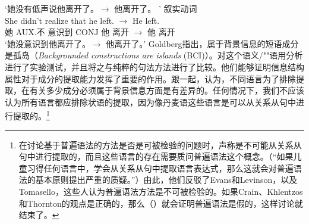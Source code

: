 \glt `她没有低声说他离开了。$\to$ 他离开了。 '
\ex 叙实动词\\
\gll She didn't realize that he left. $\to$ He left.\\
她 AUX.不 意识到 CONJ 他 离开 $\to$ 他 离开\\
\glt `她没意识到他离开了。$\to$ 他离开了。'
\zl
Goldberg指出，属于背景信息的短语成分是孤岛（\emph{Backgrounded constructions are islands} (BCI)）。\citet{AG2008a}对这个语义/""语用分析进行了实验测试，并且将之与纯粹的句法方法进行了比较。他们能够证明信息结构属性对于成分的提取能力发挥了重要的作用。跟\citet[Section~3.H]{Erteschik73a-u}一起，\citet[]{AG2008a}认为，不同语言为了排除提取，在有关多少成分必须属于背景信息方面是有差异的。任何情况下，我们不应该认为所有语言都应排除状语的提取，因为像丹麦语这些语言是可以从关系从句中进行提取的。\footnote{
在讨论基于普遍语法的方法是否是可被检验的问题时，\citet*[]{CKT2010a}声称是不可能从关系从句中进行提取的，而且这些语言的存在需要质问普遍语法这个概念。（“如果儿童习得任何语言中，学会从关系从句中提取语言表达式，那么这就会对普遍语法的基本原则提出严重的质疑。”）由此，他们反驳了Evans和Levinson，以及Tomasello，这些人认为普遍语法方法是不可被检验的。如果Crain、Khlentzos 和Thornton的观点是正确的，那么（）就会证明普遍语法是假的，这样讨论就结束了。
}
